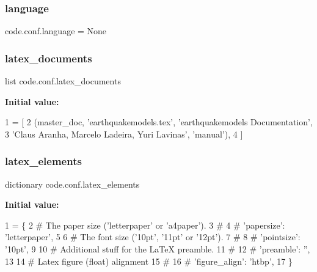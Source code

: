 \subsubsection{\texorpdfstring{language}{language}}
{\footnotesize\ttfamily code.\+conf.\+language = None}

\mbox{\label{namespacecode_1_1conf_ac3b3aace54760e2d1f649228846f441f}} 
\subsubsection{\texorpdfstring{latex\+\_\+documents}{latex\_documents}}
{\footnotesize\ttfamily list code.\+conf.\+latex\+\_\+documents}

{\bfseries Initial value\+:}
\begin{DoxyCode}
1 =  [
2     (master\_doc, \textcolor{stringliteral}{'earthquakemodels.tex'}, \textcolor{stringliteral}{'earthquakemodels Documentation'},
3      \textcolor{stringliteral}{'Claus Aranha, Marcelo Ladeira, Yuri Lavinas'}, \textcolor{stringliteral}{'manual'}),
4 ]
\end{DoxyCode}
\mbox{\label{namespacecode_1_1conf_aa6eee196fd5daecd5ba7048204152341}} 
\subsubsection{\texorpdfstring{latex\+\_\+elements}{latex\_elements}}
{\footnotesize\ttfamily dictionary code.\+conf.\+latex\+\_\+elements}

{\bfseries Initial value\+:}
\begin{DoxyCode}
1 =  \{
2     \textcolor{comment}{# The paper size ('letterpaper' or 'a4paper').}
3     \textcolor{comment}{#}
4     \textcolor{comment}{# 'papersize': 'letterpaper',}
5 
6     \textcolor{comment}{# The font size ('10pt', '11pt' or '12pt').}
7     \textcolor{comment}{#}
8     \textcolor{comment}{# 'pointsize': '10pt',}
9 
10     \textcolor{comment}{# Additional stuff for the LaTeX preamble.}
11     \textcolor{comment}{#}
12     \textcolor{comment}{# 'preamble': '',}
13 
14     \textcolor{comment}{# Latex figure (float) alignment}
15     \textcolor{comment}{#}
16     \textcolor{comment}{# 'figure\_align': 'htbp',}
17 \}
\end{DoxyCode}
\mbox{\label{namespacecode_1_1conf_a0df00565ac2afa48150285440c8a7075}} 
